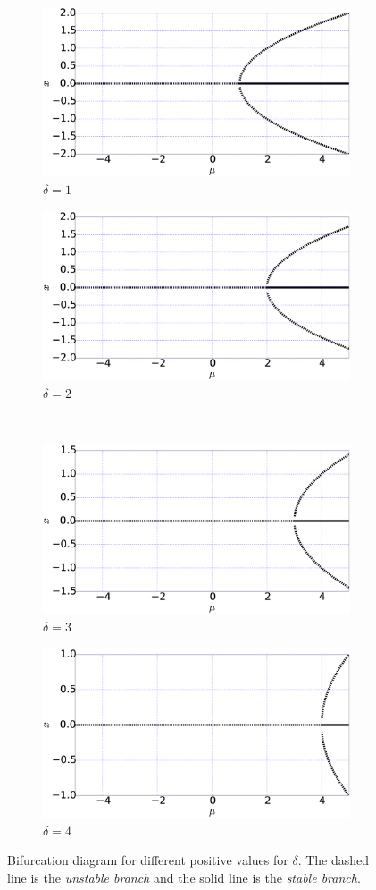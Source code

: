 %
\begin{figure}[h]
	\centering
	\begin{subfigure}[h]{8.0 cm}
		\includegraphics[width=8.0 cm]{figure/Q2/original/delta1.eps}
		\caption{$\delta = 1$}
	\end{subfigure}
	\begin{subfigure}[h]{8.0 cm}
        \includegraphics[width=8.0 cm]{figure/Q2/original/delta2.eps}
		\caption{$\delta = 2$}
    \end{subfigure}
    \\
    \begin{subfigure}[h]{8.0 cm}
		\includegraphics[width=8.0 cm]{figure/Q2/original/delta3.eps}
		\caption{$\delta = 3$}
	\end{subfigure}
	\begin{subfigure}[h]{8.0 cm}
        \includegraphics[width=8.0 cm]{figure/Q2/original/delta4.eps}
		\caption{$\delta = 4$}
    \end{subfigure}
    \caption{Bifurcation diagram for different positive values for $\delta$. The dashed line is the \emph{unstable branch} and the solid line is the \emph{stable branch}.}
    \label{fig:bifurcation}
\end{figure}
%